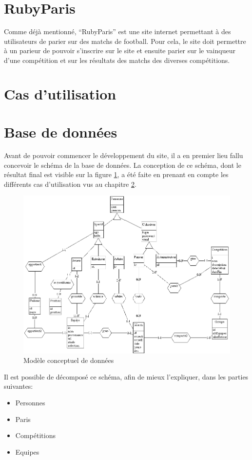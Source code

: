 \documentclass[10pt,a4paper,titlepage]{article}
\begin{document}
\section{RubyParis}
Comme déjà mentionné, “RubyParis” est une site internet permettant à des utilisateurs de parier sur des matchs de football. Pour cela, le site doit permettre à un parieur de pouvoir s'inscrire sur le site et ensuite parier sur le vainqueur d'une compétition et sur les résultats des matchs des diverses compétitions. 

\section{Cas d'utilisation}\label{casUtilisation}

\section{Base de données}
Avant de pouvoir commencer le développement du site, il a en premier lieu fallu concevoir le schéma de la base de données. La conception de ce schéma, dont le résultat final est visible sur la figure \ref{MDC}, a été faite en prenant en compte les différents cas d'utilisation vus au chapitre \ref{casUtilisation}.\\
\begin{figure}[!h]
	\begin{center}
			\includegraphics[width=12cm]{imgs/MDC.png}
			\caption{Modèle conceptuel de données}
			\label{MDC}
	\end{center}
\end{figure}

Il est possible de décomposé ce schéma, afin de mieux l'expliquer, dans les parties suivantes:
\begin{itemize}
	\item{Personnes}
	\item{Paris}
	\item{Compétitions}
	\item{Equipes}
\end{itemize}
\end{document}
